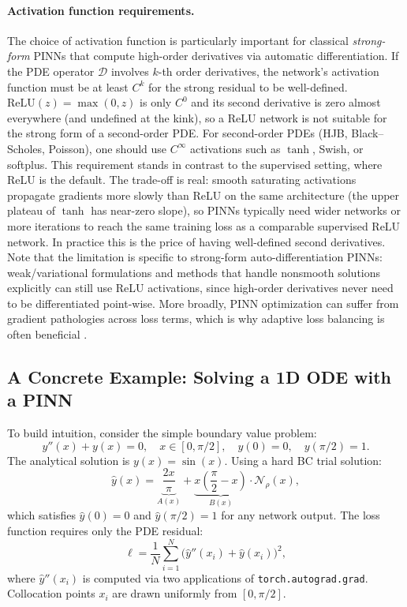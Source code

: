 \documentclass[11pt,a4paper]{report}
\begin{document}
\paragraph{Activation function requirements.}  The choice of activation function is particularly important for classical \emph{strong-form} PINNs that compute high-order derivatives via automatic differentiation.  If the PDE operator $\mathcal{D}$ involves $k$-th order derivatives, the network's activation function must be at least $C^k$ for the strong residual to be well-defined.  $\mathrm{ReLU}(z) = \max(0,z)$ is only $C^0$ and its second derivative is zero almost everywhere (and undefined at the kink), so a ReLU network is not suitable for the strong form of a second-order PDE.  For second-order PDEs (HJB, Black--Scholes, Poisson), one should use $C^\infty$ activations such as $\tanh$, Swish, or softplus.  This requirement stands in contrast to the supervised setting, where ReLU is the default.  The trade-off is real: smooth saturating activations propagate gradients more slowly than ReLU on the same architecture (the upper plateau of $\tanh$ has near-zero slope), so PINNs typically need wider networks or more iterations to reach the same training loss as a comparable supervised ReLU network.  In practice this is the price of having well-defined second derivatives.  Note that the limitation is specific to strong-form auto-differentiation PINNs: weak/variational formulations and methods that handle nonsmooth solutions explicitly can still use ReLU activations, since high-order derivatives never need to be differentiated point-wise.  More broadly, PINN optimization can suffer from gradient pathologies across loss terms, which is why adaptive loss balancing is often beneficial \citep{wang2021understanding, bischof2025relobralo}.

\subsection{A Concrete Example: Solving a 1D ODE with a PINN}

To build intuition, consider the simple boundary value problem:
\begin{equation}
y''(x) + y(x) = 0, \quad x \in [0, \pi/2], \quad y(0) = 0, \quad y(\pi/2) = 1.
\end{equation}
The analytical solution is $y(x) = \sin(x)$.  Using a hard BC trial solution:
\begin{equation}
\hat{y}(x) = \underbrace{\frac{2x}{\pi}}_{A(x)} + \underbrace{x\!\left(\frac{\pi}{2} - x\right)}_{B(x)} \cdot \mathcal{N}_\rho(x),
\label{eq:1d_ode_trial}
\end{equation}
which satisfies $\hat{y}(0) = 0$ and $\hat{y}(\pi/2) = 1$ for any network output.  The loss function requires only the PDE residual:
\begin{equation}
\ell = \frac{1}{N}\sum_{i=1}^{N}\big(\hat{y}''(x_i) + \hat{y}(x_i)\big)^2,
\end{equation}
where $\hat{y}''(x_i)$ is computed via two applications of \texttt{torch.autograd.grad}.  Collocation points $x_i$ are drawn uniformly from $[0, \pi/2]$.
\end{document}
